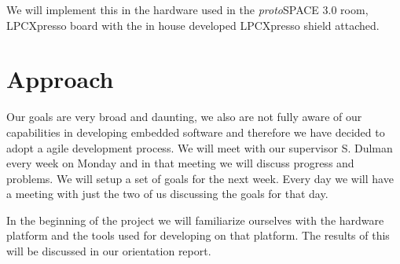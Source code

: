 \documentclass[twocolumn]{article}
\newcommand{\protospace}{\textit{proto}SPACE }
\begin{document}
	We will implement this in the hardware used in the \protospace 3.0 room, LPCXpresso board with the in house developed LPCXpresso shield attached.

\section{Approach}
	Our goals are very broad and daunting, we also are not fully aware of our capabilities in developing embedded software and therefore we have decided to adopt a agile development process.
	We will meet with our supervisor S. Dulman every week on Monday and in that meeting we will discuss progress and problems.
	We will setup a set of goals for the next week.
	Every day we will have a meeting with just the two of us discussing the goals for that day.
	
	In the beginning of the project we will familiarize ourselves with the hardware platform and the tools used for developing on that platform.
	The results of this will be discussed in our orientation report.
\end{document}
